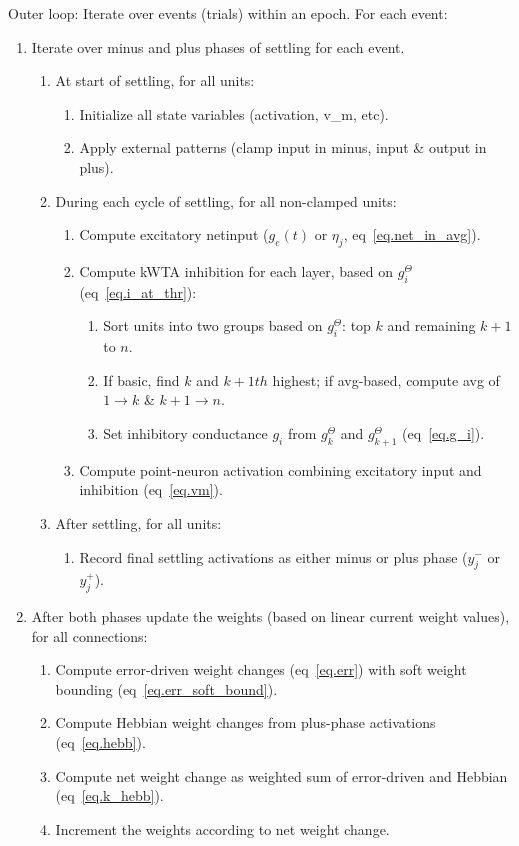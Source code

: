 Outer loop: Iterate over events (trials) within an epoch.  For each event:
\begin{enumerate}
\item Iterate over minus and plus phases of settling for each event.
  \begin{enumerate}
  \item At start of settling, for all units:
    \begin{enumerate}
    \item Initialize all state variables (activation, v\_m, etc).
    \item Apply external patterns (clamp input in minus, input \&
      output in plus).
    \end{enumerate}
  \item During each cycle of settling, for all non-clamped units:
    \begin{enumerate}
    \item Compute excitatory netinput ($g_e(t)$ or $\eta_j$,
      eq~\ref{eq.net_in_avg}).
    \item Compute kWTA inhibition for each layer, based on $g_i^{\Theta}$
      (eq~\ref{eq.i_at_thr}):
      \begin{enumerate}
      \item Sort units into two groups based on $g_i^{\Theta}$: top $k$ and
        remaining $k+1$ to $n$.
      \item If basic, find $k$ and $k+1th$ highest; if
        avg-based, compute avg of $1\rightarrow k$ \& $k+1
        \rightarrow n$.
      \item Set inhibitory conductance $g_i$ from $g^{\Theta}_k$ and
        $g^{\Theta}_{k+1}$ (eq~\ref{eq.g_i}).
      \end{enumerate}
    \item Compute point-neuron activation combining excitatory input and
      inhibition (eq~\ref{eq.vm}).
    \end{enumerate}
  \item After settling, for all units:
    \begin{enumerate}
    \item Record final settling activations as either minus or plus
      phase ($y^-_j$ or $y^+_j$).
    \end{enumerate}
  \end{enumerate}
  \item After both phases update the weights (based on linear current
    weight values), for all connections:
  \begin{enumerate}
  \item Compute error-driven weight changes (eq~\ref{eq.err}) with
    soft weight bounding (eq~\ref{eq.err_soft_bound}).
  \item Compute Hebbian weight changes from plus-phase activations
    (eq~\ref{eq.hebb}).
  \item Compute net weight change as weighted sum of error-driven and
    Hebbian (eq~\ref{eq.k_hebb}).
  \item Increment the weights according to net weight change.
  \end{enumerate}
\end{enumerate}

